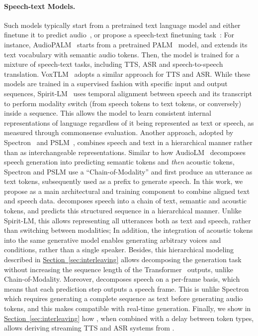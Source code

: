 \paragraph{Speech-text Models.}
Such models typically start from a pretrained text language model and either finetune it to predict audio~\citep{twist}, or propose a speech-text finetuning task~\citep{audiopalm,voxtlm,spectron,spiritlm,mitsui2024pslmparallelgenerationtext}: For instance, AudioPALM~\citep{audiopalm} starts from a pretrained PALM~\citep{palm} model, and extends its text vocabulary with semantic audio tokens. Then, the model is trained for a mixture of speech-text tasks, including TTS, ASR and speech-to-speech translation. VoxTLM~\citep{voxtlm} adopts a similar approach for TTS and ASR. While these models are trained in a supervised fashion with specific input and output sequences, Spirit-LM~\citep{spiritlm} uses temporal alignment between speech and its transcript to perform modality switch (from speech tokens to text tokens, or conversely) inside a sequence. This allows the model to learn consistent internal representations of language regardless of it being represented as text or speech, as measured through commonsense evaluation. Another approach, adopted by Spectron~\citep{spectron} and PSLM~\citep{mitsui2024pslmparallelgenerationtext}, combines speech and text in a hierarchical manner rather than as interchangeable representations. Similar to how AudioLM~\citep{audiolm} decomposes speech generation into predicting semantic tokens and \textit{then} acoustic tokens, Spectron and PSLM use a ``Chain-of-Modality'' and first produce an utterance as text tokens, subsequently used as a prefix to generate speech. In this work, we propose \interleaving as a main architectural and training component to combine aligned text and speech data. \interleaving decomposes speech into a chain of text, semantic and acoustic tokens, and predicts this structured sequence in a hierarchical manner. Unlike Spirit-LM, this allows representing all utterances both as text and speech, rather than switching between modalities; In addition, the integration of acoustic tokens into the same generative model enables generating arbitrary voices and conditions, rather than a single speaker. Besides, this hierarchical modeling described in \hyperref[sec:interleaving]{Section~\ref{sec:interleaving}} allows decomposing the generation task without increasing the sequence length of the Transformer~\citep{attentionvaswani} outputs, unlike Chain-of-Modality. Moreover, \interleaving decomposes speech on a per-frame basis, which means that each prediction step outputs a speech frame. This is unlike Spectron which requires generating a complete sequence as text before generating audio tokens, and this makes \ours{} compatible with real-time generation. Finally, we show in \hyperref[sec:interleaving]{Section~\ref{sec:interleaving}} how \interleaving, when combined with a delay between token types, allows deriving streaming TTS and ASR systems from \ours{}.

